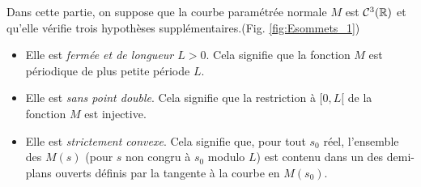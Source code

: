 Dans cette partie, on suppose que la courbe paramétrée normale $M$ est $\mathcal C^3(\mathbb{R})$ et qu'elle vérifie trois hypothèses supplémentaires.(Fig. \ref{fig:Esommets_1})
\begin{itemize}
 \item Elle est \emph{fermée et de longueur $L>0$}. Cela signifie que la fonction $M$ est périodique de plus petite période $L$.
\item Elle est \emph{sans point double}. Cela signifie que la restriction à $[0,L[$ de la fonction $M$ est injective.
\item Elle est \emph{strictement convexe}. Cela signifie que, pour tout $s_0$ réel, l'ensemble des $M(s)$ (pour $s$ non congru à $s_0$ modulo $L$) est contenu dans un des demi-plans ouverts définis par la tangente à la courbe en $M(s_0)$.
\end{itemize}
